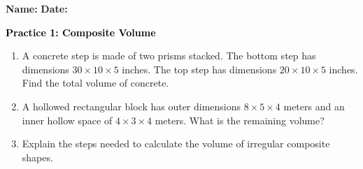 \documentclass[12pt, letterpaper, fleqn]{article}
\begin{document}
\textbf{Name:} \underline{\hspace{5cm}}
\hfill
\textbf{Date:} \underline{\hspace{3cm}}\\

\begin{tcolorbox}[colback=customteal!20]
    \large\textcolor{black}{\textbf{Practice 1: Composite Volume}}
\end{tcolorbox}
\begin{enumerate}[itemsep=3.5cm, leftmargin=0.6cm]
\item A concrete step is made of two prisms stacked. The bottom step has dimensions $30 \times 10 \times 5$ inches. The top step has dimensions $20 \times 10 \times 5$ inches. Find the total volume of concrete.
\vspace{3.5cm}
\item A hollowed rectangular block has outer dimensions $8 \times 5 \times 4$ meters and an inner hollow space of $4 \times 3 \times 4$ meters. What is the remaining volume?
\vspace{3.5cm}
\item Explain the steps needed to calculate the volume of irregular composite shapes.
\end{enumerate}
\end{document}
